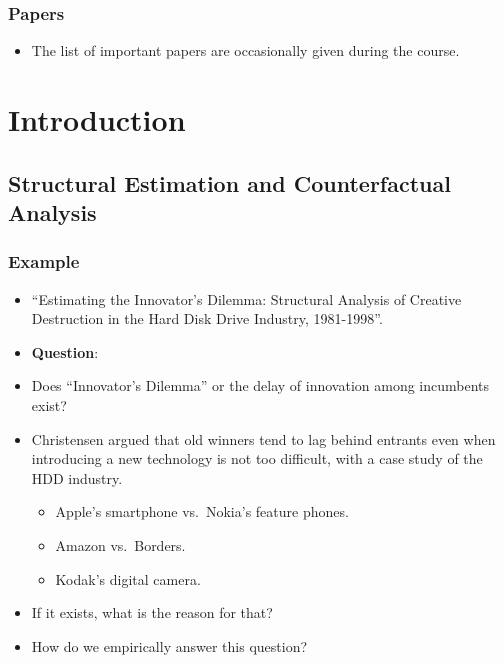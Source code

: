\documentclass[
]{book}
\providecommand{\tightlist}{%
  \setlength{\itemsep}{0pt}\setlength{\parskip}{0pt}}
\begin{document}
\hypertarget{papers}{%
\subsection{Papers}\label{papers}}

\begin{itemize}
\tightlist
\item
  The list of important papers are occasionally given during the course.
\end{itemize}

\hypertarget{intro}{%
\chapter{Introduction}\label{intro}}

\hypertarget{structural-estimation-and-counterfactual-analysis}{%
\section{Structural Estimation and Counterfactual Analysis}\label{structural-estimation-and-counterfactual-analysis}}

\hypertarget{example}{%
\subsection{Example}\label{example}}

\begin{itemize}
\item
  \citet{Igami2017} ``Estimating the Innovator's Dilemma: Structural Analysis of Creative Destruction in the Hard Disk Drive Industry, 1981-1998''.
\item
  \textbf{Question}:
\item
  Does ``Innovator's Dilemma'' \citep{Christensen1997} or the delay of innovation among incumbents exist?
\item
  Christensen argued that old winners tend to lag behind entrants even when introducing a new technology is not too difficult, with a case study of the HDD industry.

  \begin{itemize}
  \tightlist
  \item
    Apple's smartphone vs.~Nokia's feature phones.
  \item
    Amazon vs.~Borders.
  \item
    Kodak's digital camera.
  \end{itemize}
\item
  If it exists, what is the reason for that?
\item
  How do we empirically answer this question?
\end{itemize}
\end{document}
